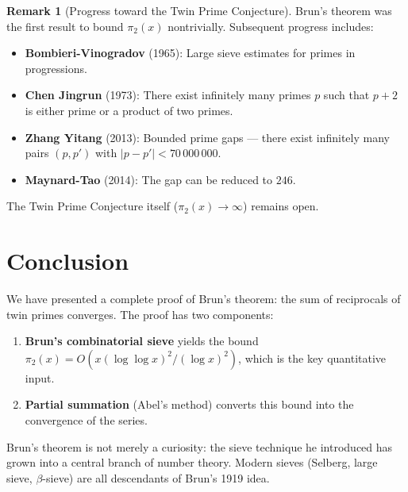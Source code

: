 \documentclass[12pt,a4paper]{amsart}
\theoremstyle{definition}
\newtheorem{remark}[theorem]{Remark}
\begin{document}
\begin{remark}[Progress toward the Twin Prime Conjecture]
  Brun's theorem was the first result to bound $\pi_2(x)$ nontrivially.
  Subsequent progress includes:
  \begin{itemize}
    \item \textbf{Bombieri-Vinogradov} (1965): Large sieve estimates for
      primes in progressions.
    \item \textbf{Chen Jingrun} (1973): There exist infinitely many primes
      $p$ such that $p+2$ is either prime or a product of two primes.
    \item \textbf{Zhang Yitang} (2013): Bounded prime gaps --- there exist
      infinitely many pairs $(p, p')$ with $|p - p'| < 70\,000\,000$.
    \item \textbf{Maynard-Tao} (2014): The gap can be reduced to $246$.
  \end{itemize}
  The Twin Prime Conjecture itself ($\pi_2(x) \to \infty$) remains open.
\end{remark}

\section{Conclusion}

We have presented a complete proof of Brun's theorem: the sum of reciprocals
of twin primes converges.  The proof has two components:
\begin{enumerate}
  \item \textbf{Brun's combinatorial sieve} yields the bound
    $\pi_2(x) = O(x(\log\log x)^2/(\log x)^2)$, which is the key
    quantitative input.
  \item \textbf{Partial summation} (Abel's method) converts this bound
    into the convergence of the series.
\end{enumerate}

Brun's theorem is not merely a curiosity: the sieve technique he introduced
has grown into a central branch of number theory.  Modern sieves (Selberg,
large sieve, $\beta$-sieve) are all descendants of Brun's 1919 idea.
\end{document}

